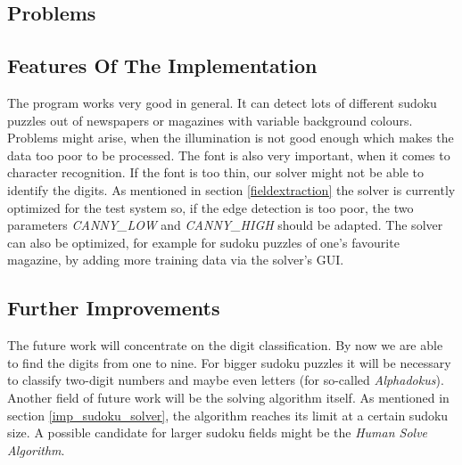 \documentclass[
a4paper,     %
12pt         %
]{scrartcl}  %
\begin{document}
\subsection{Problems}

\subsection{Features Of The Implementation}
The program works very good in general. It can detect lots of different sudoku puzzles out of newspapers or magazines with variable background colours.
Problems might arise, when the illumination is not good enough which makes the data too poor to be processed. The font is also very important,
when it comes to character recognition. If the font is too thin, our solver might not be able to identify the digits. As mentioned in section 
\ref{fieldextraction} the solver is currently optimized for the test system so, if the edge detection is too poor, 
the two parameters \emph{CANNY\_LOW} and \emph{CANNY\_HIGH} should be adapted. The solver can also be optimized, for example for sudoku puzzles
of one's favourite magazine, by adding more training data via the solver's GUI.

\subsection{Further Improvements}
The future work will concentrate on the digit classification. By now we are able to find the digits from one to nine. For bigger sudoku puzzles
it will be necessary to classify two-digit numbers and maybe even letters (for so-called \emph{Alphadokus}). Another field of future work will
be the solving algorithm itself. As mentioned in section \ref{imp_sudoku_solver}, the algorithm reaches its limit at a certain sudoku size. A 
possible candidate for larger sudoku fields might be the \emph{Human Solve Algorithm}.




% 

% 
\end{document}
